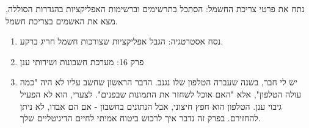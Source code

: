 \begin{tcbpractice}{נתח את פרטי צריכת החשמל: הסתכל בתרשימים וברשימות האפליקציות בהגדרות הסוללה, מצא את האשמים בצריכת חשמל.}
\begin{enumerate}
  \item נסח אסטרטגיה: הגבל אפליקציות שצורכות חשמל חריג ברקע.
  \item פרק 16: מערכת חשבונות ושירותי ענן
  \item יש לי חבר, בשנה שעברה הטלפון שלו נגנב. הדבר הראשון שחשב עליו לא היה "כמה עולה הטלפון", אלא "האם אוכל לשחזר את התמונות שבפנים". לצערי, הוא לא הפעיל גיבוי ענן. הטלפון הוא חפץ חיצוני, אבל הנתונים בחשבון - אם הם אבדו, לא ניתן להחזירם. בפרק זה נדבר איך לרכוש ביטוח אמיתי לחיים הדיגיטליים שלך.
\end{enumerate}

\end{tcbpractice}
